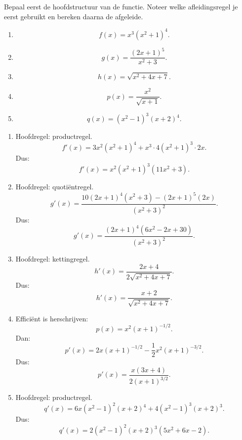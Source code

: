 \documentclass{ximera}
\begin{document}
\begin{oefening}{\oefU\ESS}

Bepaal eerst de hoofdstructuur van de functie.
Noteer welke afleidingsregel je eerst gebruikt en bereken daarna de afgeleide.

\begin{enumerate}
  \item \[f(x)=x^3(x^2+1)^4.\]
  \item \[g(x)=\frac{(2x+1)^5}{x^2+3}.\]
  \item \[h(x)=\sqrt{x^2+4x+7}.\]
  \item \[p(x)=\frac{x^2}{\sqrt{x+1}}.\]
  \item \[q(x)=(x^2-1)^3(x+2)^4.\]
\end{enumerate}

\begin{oplossing}
\begin{enumerate}
  \item Hoofdregel: productregel.
  \[
  f'(x)=3x^2(x^2+1)^4+x^3\cdot4(x^2+1)^3\cdot2x.
  \]
  Dus:
  \[\boxed{f'(x)=x^2(x^2+1)^3(11x^2+3).}\]

  \item Hoofdregel: quotiëntregel.
  \[
  g'(x)=
  \frac{10(2x+1)^4(x^2+3)-(2x+1)^5(2x)}{(x^2+3)^2}.
  \]
  Dus:
  \[\boxed{g'(x)=\frac{(2x+1)^4(6x^2-2x+30)}{(x^2+3)^2}.}\]

  \item Hoofdregel: kettingregel.
  \[
  h'(x)=\frac{2x+4}{2\sqrt{x^2+4x+7}}.
  \]
  Dus:
  \[\boxed{h'(x)=\frac{x+2}{\sqrt{x^2+4x+7}}.}\]

  \item Efficiënt is herschrijven:
  \[p(x)=x^2(x+1)^{-1/2}.\]
  Dan:
  \[
  p'(x)=2x(x+1)^{-1/2}-\frac12x^2(x+1)^{-3/2}.
  \]
  Dus:
  \[\boxed{p'(x)=\frac{x(3x+4)}{2(x+1)^{3/2}}.}\]

  \item Hoofdregel: productregel.
  \[
  q'(x)=6x(x^2-1)^2(x+2)^4+4(x^2-1)^3(x+2)^3.
  \]
  Dus:
  \[\boxed{q'(x)=2(x^2-1)^2(x+2)^3(5x^2+6x-2).}\]
\end{enumerate}
\end{oplossing}

\end{oefening}
\end{document}
